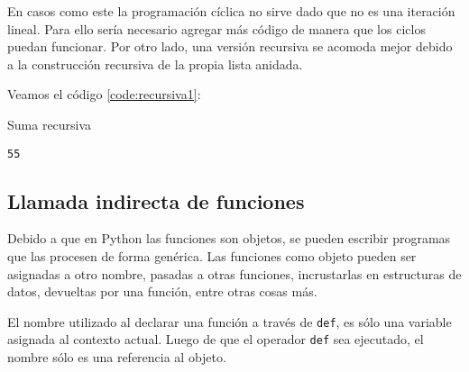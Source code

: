 En casos como este la programación cíclica no sirve dado que no es una
iteración lineal. Para ello sería necesario agregar más código de manera
que los ciclos puedan funcionar. Por otro lado, una versión recursiva se
acomoda mejor debido a la construcción recursiva de la propia lista
anidada.

Veamos el código \ref{code:recursiva1}:\\

\begin{code} Suma recursiva
\begin{Shaded}
\begin{Highlighting}[]
\OperatorTok{=} 
          \NormalTok{):}
\OperatorTok{+=}
        \NormalTok{:}
\OperatorTok{+=}

\NormalTok{(miSuma([}\NormalTok{, [}\NormalTok{, [}\NormalTok{, }\NormalTok{], }\NormalTok{], }\NormalTok{, [}\NormalTok{, }\NormalTok{], [[}\NormalTok{], [}\NormalTok{]]]))}
\end{Highlighting}
\end{Shaded}

\begin{verbatim}
55
\end{verbatim}
\label{code:recursiva1}
\end{code}

\subsection{Llamada indirecta de funciones}

Debido a que en Python las funciones son objetos, se pueden escribir
programas que las procesen de forma genérica. Las funciones como objeto
pueden ser asignadas a otro nombre, pasadas a otras funciones,
incrustarlas en estructuras de datos, devueltas por una función, entre
otras cosas más.

El nombre utilizado al declarar una función a través de \texttt{def}, es
sólo una variable asignada al contexto actual. Luego de que el operador
\texttt{def} sea ejecutado, el nombre sólo es una referencia al objeto.

